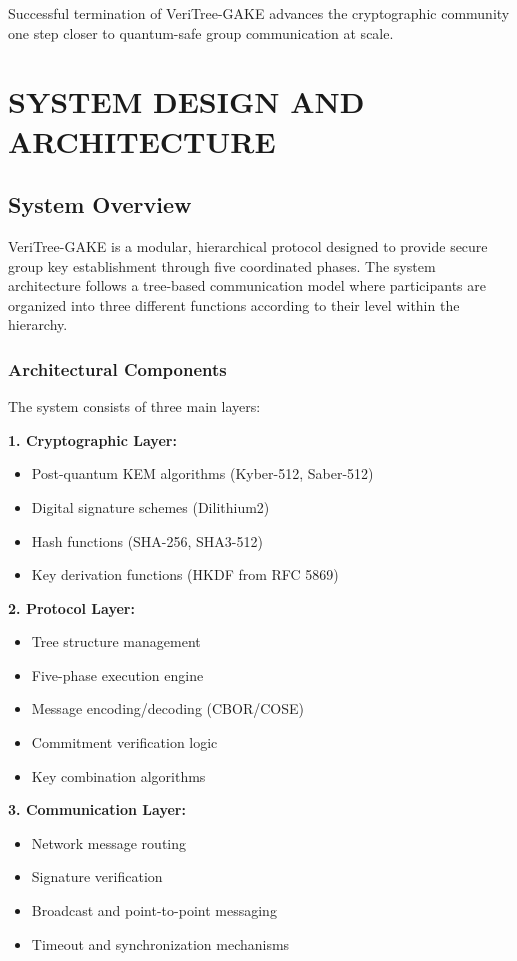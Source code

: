 \documentclass[12pt,a4paper]{report}
\begin{document}
Successful termination of VeriTree-GAKE advances the cryptographic community one step closer to quantum-safe group communication at scale.


\chapter{SYSTEM DESIGN AND ARCHITECTURE}

\section{System Overview}

VeriTree-GAKE is a modular, hierarchical protocol designed to provide secure
group key establishment through five coordinated phases. The system architecture follows a tree-based communication model where participants are organized into three
different functions according to their level within the hierarchy.

\subsection{Architectural Components}

The system consists of three main layers:

\textbf{1. Cryptographic Layer:}
\begin{itemize}
\item Post-quantum KEM algorithms (Kyber-512, Saber-512)
\item Digital signature schemes (Dilithium2)
\item Hash functions (SHA-256, SHA3-512)
\item Key derivation functions (HKDF from RFC 5869)
\end{itemize}

\textbf{2. Protocol Layer:}
\begin{itemize}
\item Tree structure management
\item Five-phase execution engine
\item Message encoding/decoding (CBOR/COSE)
\item Commitment verification logic
\item Key combination algorithms
\end{itemize}

\textbf{3. Communication Layer:}
\begin{itemize}
\item Network message routing
\item Signature verification
\item Broadcast and point-to-point messaging
\item Timeout and synchronization mechanisms
\end{itemize}
\end{document}
